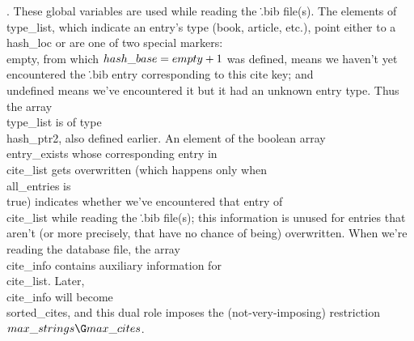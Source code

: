 .
These global variables are used while reading the \.{.bib} file(s).
The elements of \\{type\_list}, which indicate an entry's type (book,
article, etc.), point either to a \\{hash\_loc} or are one of two special
markers: \\{empty}, from which $\\{hash\_base}=\\{empty}+1$ was defined,
means we haven't yet encountered the \.{.bib} entry corresponding to
this cite key; and \\{undefined} means we've encountered it but it had
an unknown entry type.  Thus the array \\{type\_list} is of type
\\{hash\_ptr2}, also defined earlier.  An element of the boolean array
\\{entry\_exists} whose corresponding entry in \\{cite\_list} gets
overwritten (which happens only when \\{all\_entries} is \\{true})
indicates whether we've encountered that entry of \\{cite\_list} while
reading the \.{.bib} file(s); this information is unused for entries
that aren't (or more precisely, that have no chance of being)
overwritten.  When we're reading the database file, the array
\\{cite\_info} contains auxiliary information for \\{cite\_list}.  Later,
\\{cite\_info} will become \\{sorted\_cites}, and this dual role imposes the
(not-very-imposing) restriction $\\{max\_strings}\G\\{max\_cites}$.

